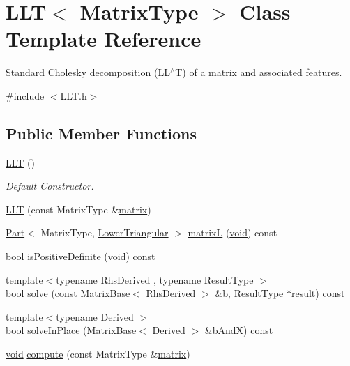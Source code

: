 \hypertarget{class_l_l_t}{\section{L\-L\-T$<$ Matrix\-Type $>$ Class Template Reference}
\label{class_l_l_t}
}


Standard Cholesky decomposition (L\-L$^\wedge$\-T) of a matrix and associated features.  




{\ttfamily \#include $<$L\-L\-T.\-h$>$}

\subsection*{Public Member Functions}
\begin{DoxyCompactItemize}
\item 
\hyperlink{class_l_l_t_a3137ff75078519115c09fe80d8c21bea}{L\-L\-T} ()
\begin{DoxyCompactList}\small\item\em Default Constructor. \end{DoxyCompactList}\item 
\hyperlink{class_l_l_t_a209d925c19e08cafed2fa7ffcd1a5257}{L\-L\-T} (const Matrix\-Type \&\hyperlink{glext_8h_a7b24a3f2f56eb1244ae69dacb4fecb6f}{matrix})
\item 
\hyperlink{class_part}{Part}$<$ Matrix\-Type, \hyperlink{_constants_8h_a9c6e15884c02c8075e3575670fe06894}{Lower\-Triangular} $>$ \hyperlink{class_l_l_t_a2a333c40e652eaec1c7195f207bb46f0}{matrix\-L} (\hyperlink{group___u_a_v_objects_plugin_ga444cf2ff3f0ecbe028adce838d373f5c}{void}) const 
\item 
bool \hyperlink{class_l_l_t_a831c8ae513e90e318100254893a8bc62}{is\-Positive\-Definite} (\hyperlink{group___u_a_v_objects_plugin_ga444cf2ff3f0ecbe028adce838d373f5c}{void}) const 
\item 
{\footnotesize template$<$typename Rhs\-Derived , typename Result\-Type $>$ }\\bool \hyperlink{class_l_l_t_a29ed8f17917594f7ac8859e2ae34a6a8}{solve} (const \hyperlink{class_matrix_base}{Matrix\-Base}$<$ Rhs\-Derived $>$ \&\hyperlink{glext_8h_a6eba317e3cf44d6d26c04a5a8f197dcb}{b}, Result\-Type $\ast$\hyperlink{qxtslotjob_8h_aab161efab0511ea9612b64c40e9852ca}{result}) const 
\item 
{\footnotesize template$<$typename Derived $>$ }\\bool \hyperlink{class_l_l_t_adb1def1609bf33b060e8cc7ae3ff8256}{solve\-In\-Place} (\hyperlink{class_matrix_base}{Matrix\-Base}$<$ Derived $>$ \&b\-And\-X) const 
\item 
\hyperlink{group___u_a_v_objects_plugin_ga444cf2ff3f0ecbe028adce838d373f5c}{void} \hyperlink{class_l_l_t_a0a0f775cd7c86abd7885b0a82dc293f0}{compute} (const Matrix\-Type \&\hyperlink{glext_8h_a7b24a3f2f56eb1244ae69dacb4fecb6f}{matrix})
\end{DoxyCompactItemize}
